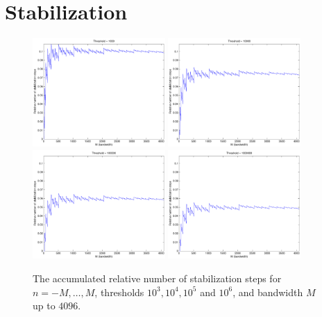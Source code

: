 \section{Stabilization}
\label{NFSFT:Stabilization}
\begin{figure}[tb]
  \centering
   \subfigure
     {\includegraphics[width=0.45\textwidth]{images/stabilization1000}}\hfill
   \subfigure
     {\includegraphics[width=0.45\textwidth]{images/stabilization10000}}\\
   \subfigure
     {\includegraphics[width=0.45\textwidth]{images/stabilization100000}}\hfill
   \subfigure
     {\includegraphics[width=0.45\textwidth]{images/stabilization1000000}}\\
  \caption{The accumulated relative number of stabilization steps for $n=-M,\ldots,M$, 
  thresholds $10^3, 10^4, 10^5$ and $10^6$, and bandwidth $M$ up to $4096$.}
  \label{NFSFT:figure:stabilization}
\end{figure}
